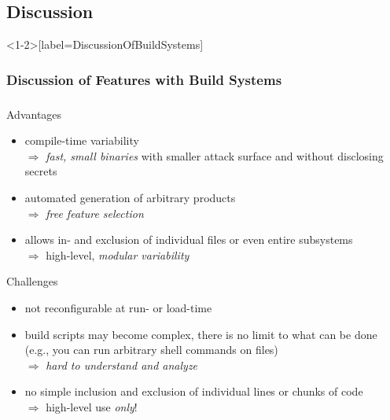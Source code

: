 \subsection{Discussion}
\newcommand{\MajorChallengesOfBuildSystems}{
	\item build scripts may become complex, there is no limit to what can be done (e.g., you can run arbitrary shell commands on files)\\
		$\Rightarrow$ \emph{hard to understand and analyze}
	\item no simple inclusion and exclusion of individual lines or chunks of code\\
	$\Rightarrow$ high-level use \emph{only}!
}
\begin{frame}<1-2>[label=DiscussionOfBuildSystems]
	\frametitle<1-2>{Discussion of Features with Build Systems}
	\frametitle<3>{\myframetitle}
	\begin{fancycolumns}
		\begin{note}{Advantages}
			\begin{itemize}
				\item compile-time variability\\
					$\Rightarrow$ \emph{fast, small binaries} with smaller attack surface and without disclosing secrets
				\item automated generation of arbitrary products\\
					$\Rightarrow$ \emph{free feature selection}
				\item allows in- and exclusion of individual files or even entire subsystems\\
					$\Rightarrow$ high-level, \emph{modular variability}
			\end{itemize}
		\end{note}
	\nextcolumn
		\begin{note}{Challenges}
			\begin{itemize}
				\item not reconfigurable at run- or load-time %
				\MajorChallengesOfBuildSystems
			\end{itemize}
		\end{note}
	\end{fancycolumns}
\end{frame}
